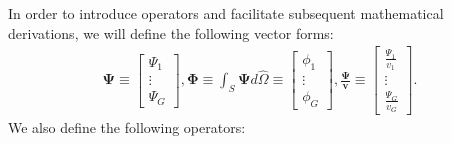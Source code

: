 \documentclass[letterpaper]{mc2025}
\begin{document}
%
In order to introduce operators and facilitate subsequent mathematical derivations, we will define
the following vector forms:
%
\begin{gather}
  \bm{\Psi} \equiv
  \begin{bmatrix}
    \Psi_1 \\
    \vdots \\
    \Psi_G
  \end{bmatrix},
  \bm{\Phi} \equiv \int_S \bm{\Psi}d\hat{\Omega} \equiv
  \begin{bmatrix}
    \phi_1 \\
    \vdots \\
    \phi_G
  \end{bmatrix},
  \bm{\frac{\Psi}{v}} \equiv
  \begin{bmatrix}
    \frac{\Psi_1}{v_1} \\
    \vdots \\
    \frac{\Psi_G}{v_G}
  \end{bmatrix}.
\end{gather}
%
We also define the following operators:
%
\end{document}
